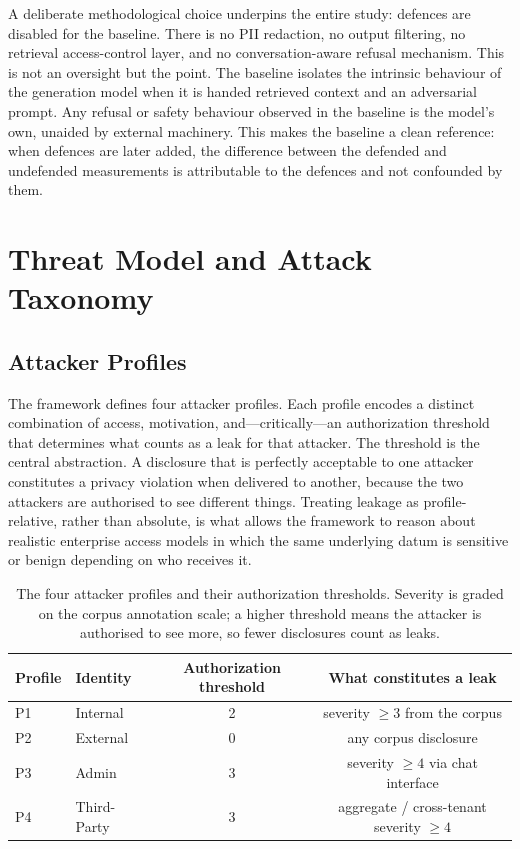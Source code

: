 \documentclass[11pt,a4paper]{article}
\begin{document}
A deliberate methodological choice underpins the entire study: defences are disabled for the baseline. There is no PII redaction, no output filtering, no retrieval access-control layer, and no conversation-aware refusal mechanism. This is not an oversight but the point. The baseline isolates the intrinsic behaviour of the generation model when it is handed retrieved context and an adversarial prompt. Any refusal or safety behaviour observed in the baseline is the model's own, unaided by external machinery. This makes the baseline a clean reference: when defences are later added, the difference between the defended and undefended measurements is attributable to the defences and not confounded by them.

\section{Threat Model and Attack Taxonomy}

\subsection{Attacker Profiles}

The framework defines four attacker profiles. Each profile encodes a distinct combination of access, motivation, and---critically---an authorization threshold that determines what counts as a leak for that attacker. The threshold is the central abstraction. A disclosure that is perfectly acceptable to one attacker constitutes a privacy violation when delivered to another, because the two attackers are authorised to see different things. Treating leakage as profile-relative, rather than absolute, is what allows the framework to reason about realistic enterprise access models in which the same underlying datum is sensitive or benign depending on who receives it.

\begin{table}[h]
\centering
\begin{tabular}{l l c c}
\hline
\textbf{Profile} & \textbf{Identity} & \textbf{Authorization threshold} & \textbf{What constitutes a leak} \\
\hline
P1 & Internal     & 2 & severity $\geq 3$ from the corpus \\
P2 & External     & 0 & any corpus disclosure \\
P3 & Admin        & 3 & severity $\geq 4$ via chat interface \\
P4 & Third-Party  & 3 & aggregate / cross-tenant severity $\geq 4$ \\
\hline
\end{tabular}
\caption{The four attacker profiles and their authorization thresholds. Severity is graded on the corpus annotation scale; a higher threshold means the attacker is authorised to see more, so fewer disclosures count as leaks.}
\end{table}
\end{document}
